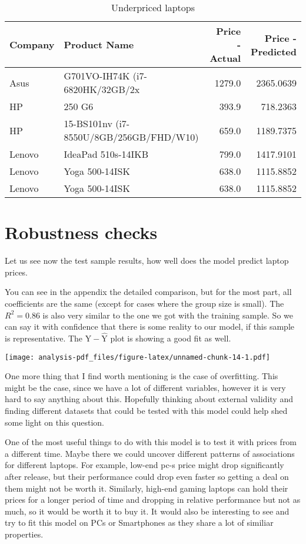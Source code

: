\documentclass[
]{article}
\begin{document}
\begin{table}

\caption{\label{tab:unnamed-chunk-12}Underpriced laptops}
\centering
\begin{tabular}[t]{l|l|r|r}
\hline
Company & Product Name & Price - Actual & Price - Predicted\\
\hline
Asus & G701VO-IH74K (i7-6820HK/32GB/2x & 1279.0 & 2365.0639\\
\hline
HP & 250 G6 & 393.9 & 718.2363\\
\hline
HP & 15-BS101nv (i7-8550U/8GB/256GB/FHD/W10) & 659.0 & 1189.7375\\
\hline
Lenovo & IdeaPad 510s-14IKB & 799.0 & 1417.9101\\
\hline
Lenovo & Yoga 500-14ISK & 638.0 & 1115.8852\\
\hline
Lenovo & Yoga 500-14ISK & 638.0 & 1115.8852\\
\hline
\end{tabular}
\end{table}

\hypertarget{robustness-checks}{%
\section{Robustness checks}\label{robustness-checks}}

Let us see now the test sample results, how well does the model predict
laptop prices.

You can see in the appendix the detailed comparison, but for the most
part, all coefficients are the same (except for cases where the group
size is small). The \(R^2=0.86\) is also very similar to the one we got
with the training sample. So we can say it with confidence that there is
some reality to our model, if this sample is representative. The
\(\text{Y} - \hat{\text{Y}}\) plot is showing a good fit as well.

\texttt{[image: analysis-pdf\_files/figure-latex/unnamed-chunk-14-1.pdf]}

One more thing that I find worth mentioning is the case of overfitting.
This might be the case, since we have a lot of different variables,
however it is very hard to say anything about this. Hopefully thinking
about external validity and finding different datasets that could be
tested with this model could help shed some light on this question.

One of the most useful things to do with this model is to test it with
prices from a different time. Maybe there we could uncover different
patterns of associations for different laptops. For example, low-end
pc-s price might drop significantly after release, but their performance
could drop even faster so getting a deal on them might not be worth it.
Similarly, high-end gaming laptops can hold their prices for a longer
period of time and dropping in relative performance but not as much, so
it would be worth it to buy it. It would also be interesting to see and
try to fit this model on PCs or Smartphones as they share a lot of
similiar properties.
\end{document}
